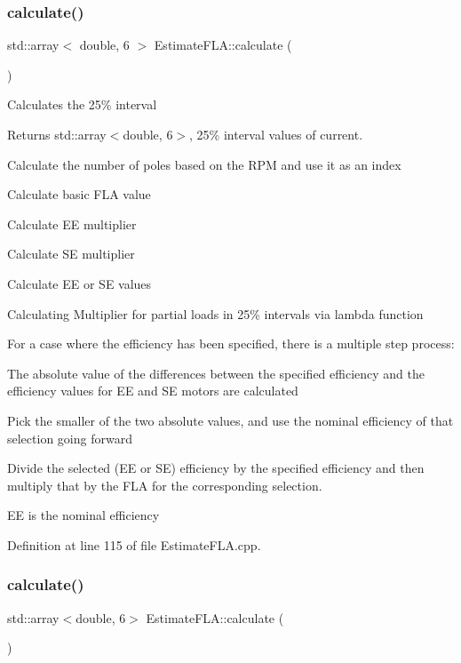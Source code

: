\subsubsection{\texorpdfstring{calculate()}{calculate()}\hspace{0.1cm}{\footnotesize\ttfamily [1/3]}}
{\footnotesize\ttfamily std\+::array$<$ double, 6 $>$ Estimate\+F\+L\+A\+::calculate (\begin{DoxyParamCaption}{ }\end{DoxyParamCaption})}

Calculates the 25\% interval \begin{DoxyReturn}{Returns}
std\+::array$<$double, 6$>$, 25\% interval values of current. 
\end{DoxyReturn}
Calculate the number of poles based on the R\+PM and use it as an index

Calculate basic F\+LA value

Calculate EE multiplier

Calculate SE multiplier

Calculate EE or SE values

Calculating Multiplier for partial loads in 25\% intervals via lambda function

For a case where the efficiency has been specified, there is a multiple step process\+:
\begin{DoxyEnumerate}
\item The absolute value of the differences between the specified efficiency and the efficiency values for EE and SE motors are calculated
\item Pick the smaller of the two absolute values, and use the nominal efficiency of that selection going forward
\item Divide the selected (EE or SE) efficiency by the specified efficiency and then multiply that by the F\+LA for the corresponding selection.
\end{DoxyEnumerate}

EE is the nominal efficiency 

Definition at line 115 of file Estimate\+F\+L\+A.\+cpp.

\mbox{\label{class_estimate_f_l_a_abb1ddcf8de5772322e2e75c8d041f740}} 
\subsubsection{\texorpdfstring{calculate()}{calculate()}\hspace{0.1cm}{\footnotesize\ttfamily [2/3]}}
{\footnotesize\ttfamily std\+::array$<$double, 6$>$ Estimate\+F\+L\+A\+::calculate (\begin{DoxyParamCaption}{ }\end{DoxyParamCaption})}

